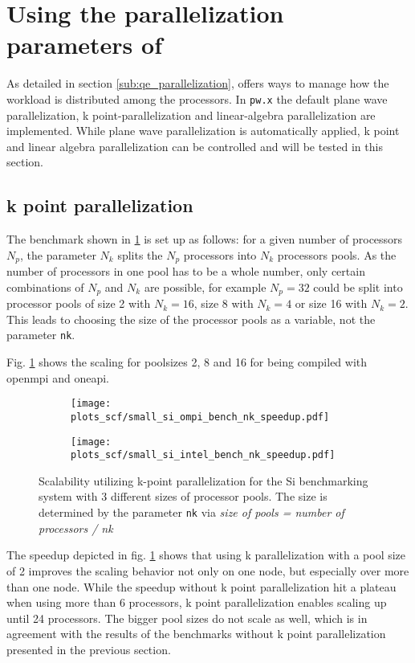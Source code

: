 \documentclass[main.tex]{subfiles}
\begin{document}
\section{Using the parallelization parameters of \QE}\label{sec:scf_scaling_qe_parallelization}

As detailed in section \ref{sub:qe_parallelization}, \QE offers ways to manage how the workload is distributed among the processors.
In \texttt{pw.x} the default plane wave parallelization, k point-parallelization and linear-algebra parallelization are implemented.
While plane wave parallelization is automatically applied, k point and linear algebra parallelization can be controlled and will be tested in this section.

\subsection{k point parallelization}\label{sub:scf_scaling_k_point}

The benchmark shown in \ref{fig:scaling_scf_nk_si} is set up as follows: for a given number of processors \(N_p\), the parameter \(N_k\) splits the \(N_p\) processors into \(N_k\) processors pools.
As the number of processors in one pool has to be a whole number, only certain combinations of \(N_p\) and \(N_k\) are possible, for example \(N_p = 32\) could be split into processor pools of size 2 with \(N_k = 16\), size 8 with \(N_k = 4\) or size 16 with \(N_k = 2\).
This leads to choosing the size of the processor pools as a variable, not the parameter \texttt{nk}.

Fig. \ref{fig:scaling_scf_nk_si} shows the scaling for poolsizes 2, 8 and 16 for \QE being compiled with \gls{openmpi} and \gls{oneapi}.

\begin{figure}[ht!]
\begin{subfigure}[b]{0.49\textwidth}
    \centering
    \texttt{[image: plots\_scf/small\_si\_ompi\_bench\_nk\_speedup.pdf]}
\end{subfigure}
\begin{subfigure}[b]{0.49\textwidth}
    \centering
    \texttt{[image: plots\_scf/small\_si\_intel\_bench\_nk\_speedup.pdf]}
\end{subfigure}
\caption{Scalability utilizing k-point parallelization for the Si benchmarking system with 3 different sizes of processor pools. The size is determined by the parameter \texttt{nk} via \emph{size of pools = number of processors / nk}}
\label{fig:scaling_scf_nk_si}
\end{figure}
The speedup depicted in fig. \ref{fig:scaling_scf_nk_si} shows that using k parallelization with a pool size of 2 improves the scaling behavior not only on one node, but especially over more than one node.
While the speedup without k point parallelization hit a plateau when using more than 6 processors, k point parallelization enables scaling up until 24 processors.
The bigger pool sizes do not scale as well, which is in agreement with the results of the benchmarks without k point parallelization presented in the previous section.
\end{document}
